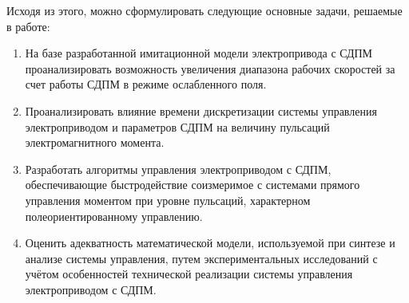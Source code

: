 \noindent Исходя из этого, можно сформулировать следующие основные задачи, решаемые в работе:
\begin{enumerate}
\item На базе разработанной имитационной модели электропривода с СДПМ проанализировать возможность увеличения диапазона рабочих скоростей за счет работы СДПМ в режиме ослабленного поля.
\item Проанализировать влияние времени дискретизации системы управления электроприводом и параметров СДПМ на величину пульсаций электромагнитного момента.
\item Разработать алгоритмы управления электроприводом с СДПМ, обеспечивающие быстродействие соизмеримое с системами прямого управления моментом при уровне пульсаций, характерном полеориентированному управлению.
\item Оценить адекватность математической модели, используемой при синтезе и анализе системы управления, путем экспериментальных исследований с учётом особенностей технической реализации системы управления электроприводом с СДПМ.
\end{enumerate}
